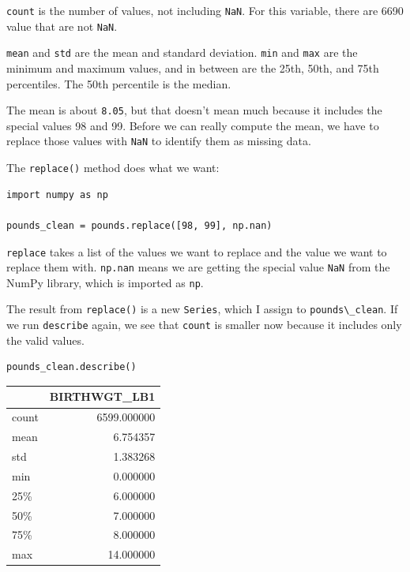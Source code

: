 \passthrough{\lstinline!count!} is the number of values, not including
\passthrough{\lstinline!NaN!}. For this variable, there are 6690 value
that are not \passthrough{\lstinline!NaN!}.

\passthrough{\lstinline!mean!} and \passthrough{\lstinline!std!} are the
mean and standard deviation. \passthrough{\lstinline!min!} and
\passthrough{\lstinline!max!} are the minimum and maximum values, and in
between are the 25th, 50th, and 75th percentiles. The 50th percentile is
the median.

The mean is about \passthrough{\lstinline!8.05!}, but that doesn't mean
much because it includes the special values 98 and 99. Before we can
really compute the mean, we have to replace those values with
\passthrough{\lstinline!NaN!} to identify them as missing data.

The \passthrough{\lstinline!replace()!} method does what we want:

\begin{lstlisting}[]
import numpy as np

pounds_clean = pounds.replace([98, 99], np.nan)
\end{lstlisting}

\passthrough{\lstinline!replace!} takes a list of the values we want to
replace and the value we want to replace them with.
\passthrough{\lstinline!np.nan!} means we are getting the special value
\passthrough{\lstinline!NaN!} from the NumPy library, which is imported
as \passthrough{\lstinline!np!}.

The result from \passthrough{\lstinline!replace()!} is a new
\passthrough{\lstinline!Series!}, which I assign to
\passthrough{\lstinline!pounds\_clean!}. If we run
\passthrough{\lstinline!describe!} again, we see that
\passthrough{\lstinline!count!} is smaller now because it includes only
the valid values.

\begin{lstlisting}[]
pounds_clean.describe()
\end{lstlisting}

\begin{tabular}{lr}
\midrule
{} &  BIRTHWGT\_LB1 \\
\midrule
count &   6599.000000 \\
mean  &      6.754357 \\
std   &      1.383268 \\
min   &      0.000000 \\
25\%   &      6.000000 \\
50\%   &      7.000000 \\
75\%   &      8.000000 \\
max   &     14.000000 \\
\midrule
\end{tabular}

